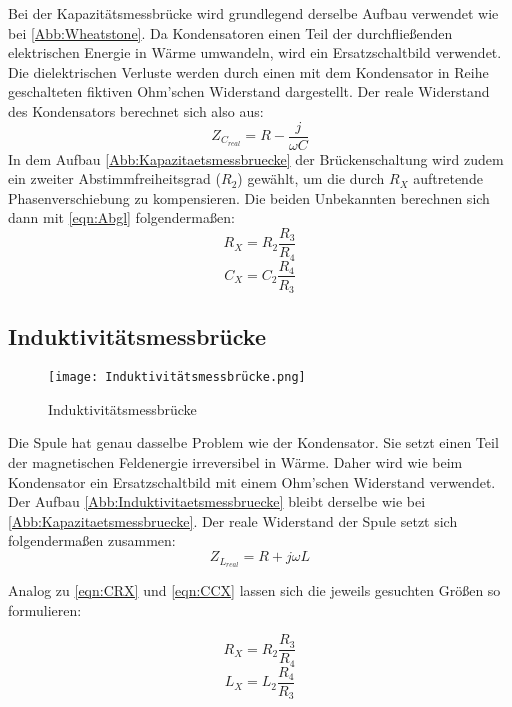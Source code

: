 Bei der Kapazitätsmessbrücke wird grundlegend derselbe Aufbau verwendet wie bei \autoref{Abb:Wheatstone}. Da Kondensatoren einen Teil der durchfließenden 
elektrischen Energie in Wärme umwandeln, wird ein Ersatzschaltbild verwendet. Die dielektrischen Verluste werden durch einen mit dem Kondensator in Reihe geschalteten
fiktiven Ohm'schen Widerstand dargestellt. Der reale Widerstand des Kondensators berechnet sich also aus:
\begin{equation*}
    Z_{C_{real}} = R - \frac{j}{\omega C}
\end{equation*}
In dem Aufbau \autoref{Abb:Kapazitaetsmessbruecke} der Brückenschaltung wird zudem ein zweiter Abstimmfreiheitsgrad ($R_2$) gewählt, um die durch $R_X$ 
auftretende Phasenverschiebung zu kompensieren.
Die beiden Unbekannten berechnen sich dann mit \autoref{eqn:Abgl} folgendermaßen:
\begin{equation}
    R_X = R_2 \frac{R_3}{R_4} \label{eqn:CRX}
\end{equation}
\begin{equation}
    C_X = C_2 \frac{R_4}{R_3} \label{eqn:CCX}
\end{equation}

\subsection{Induktivitätsmessbrücke}

\begin{figure}
    \centering
    \texttt{[image: Induktivitätsmessbrücke.png]}
    \caption{Induktivitätsmessbrücke \cite{Blatt}}
    \label{Abb:Induktivitaetsmessbruecke}
\end{figure}

Die Spule hat genau dasselbe Problem wie der Kondensator. Sie setzt einen Teil der magnetischen Feldenergie irreversibel in Wärme. Daher wird wie beim Kondensator
ein Ersatzschaltbild mit einem Ohm'schen Widerstand verwendet. Der Aufbau \autoref{Abb:Induktivitaetsmessbruecke} bleibt derselbe wie bei \autoref{Abb:Kapazitaetsmessbruecke}.
Der reale Widerstand der Spule setzt sich folgendermaßen zusammen:
\begin{equation*}
    Z_{L_{real}} = R + j \omega L
\end{equation*}
 
Analog zu \autoref{eqn:CRX} und \autoref{eqn:CCX} lassen sich die jeweils gesuchten Größen so formulieren:

\begin{equation}
    R_X = R_2 \frac{R_3}{R_4} \label{eqn:LRX}
\end{equation}
\begin{equation}
    L_X = L_2 \frac{R_4}{R_3} \label{eqn:LLX}
\end{equation}

